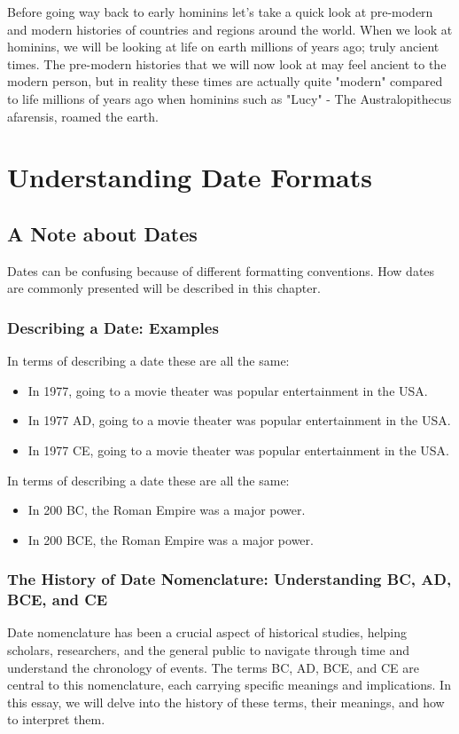 \documentclass[a4paper,12pt]{book}
\begin{document}
Before going way back to early hominins let's take a quick look at pre-modern and modern histories of countries and regions around the world. When we look at hominins, we will be looking at life on earth millions of years ago; truly ancient times. The pre-modern histories that we will now look at may feel ancient to the modern person, but in reality these times are actually quite "modern" compared to life millions of years ago when hominins such as "Lucy" - The Australopithecus afarensis, roamed the earth. 

\chapter{Understanding Date Formats}
\section*{A Note about Dates}
Dates can be confusing because of different formatting conventions. How dates are commonly presented will be described in this chapter.

\subsection*{Describing a Date: Examples}
In terms of describing a date these are all the same:

\begin{itemize}
    \item In 1977, going to a movie theater was popular entertainment in the USA.
    \item In 1977 AD, going to a movie theater was popular entertainment in the USA.
    \item In 1977 CE, going to a movie theater was popular entertainment in the USA.
\end{itemize}

In terms of describing a date these are all the same:

\begin{itemize}
    \item In 200 BC, the Roman Empire was a major power.
    \item In 200 BCE, the Roman Empire was a major power.
\end{itemize}

\subsection*{The History of Date Nomenclature: Understanding BC, AD, BCE, and CE}
Date nomenclature has been a crucial aspect of historical studies, helping scholars, researchers, and the general public to navigate through time and understand the chronology of events. The terms BC, AD, BCE, and CE are central to this nomenclature, each carrying specific meanings and implications. In this essay, we will delve into the history of these terms, their meanings, and how to interpret them.
\end{document}
